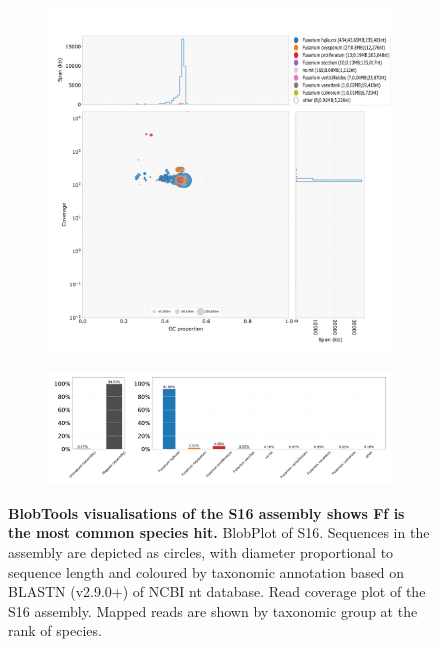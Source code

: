 \begin{figure}[hp!]
    \centering
    \begin{subfigure}[]{0.9\textwidth}
        \centering
        \includegraphics[width=\textwidth]{Figures/TNAU_S16.species.blobplot.pdf}
        \caption{}
        \label{fig:BlobPlot-S16}
    \end{subfigure}
    \begin{subfigure}[]{0.9\textwidth}
        \centering
        \includegraphics[width=\textwidth]{Figures/TNAU_S16.blobtools.blobDB.json.bestsum.species.p8.span.100.blobplot.read_cov.bam0.pdf}
        \caption{}
        \label{fig:BlobPlot_readcov-S16}
    \end{subfigure}
    \caption[BlobTools visualisations of the S16 assembly]{\textbf{BlobTools visualisations of the S16 assembly shows \acf{Ff} is the most common species hit.}
         BlobPlot of S16. Sequences in the assembly are depicted as circles, with diameter proportional to sequence length and coloured by taxonomic annotation based on BLASTN (v2.9.0+) of NCBI nt database.
         Read coverage plot of the S16 assembly. Mapped reads are shown by taxonomic group at the rank of species.}
        \label{fig:S16:BlobTools}
\end{figure}
